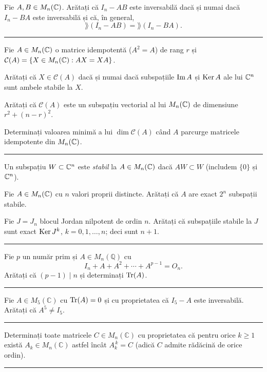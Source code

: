 Fie $A,B \in M_n(\mathbb{C})$. Arătați că $I_n - AB$ este inversabilă dacă și numai dacă $I_n - BA$ este inversabilă și că, în general,
\[
\rang(I_n - AB) = \rang(I_n - BA).
\]
\vspace{1mm}\hrule

Fie $A\in M_n(\mathbb{C})$ o matrice idempotentă ($A^2=A$) de rang $r$ și $\mathcal{C}(A)=\{X\in M_n(\mathbb{C}): AX=XA\}$.
\begin{parti}
  \item Arătați că $X\in\mathcal{C}(A)$ dacă și numai dacă subspațiile $\operatorname{Im} A$ și $\operatorname{Ker} A$ ale lui $\mathbb{C}^n$ sunt ambele stabile la $X$.
  \item Arătați că $\mathcal{C}(A)$ este un subspațiu vectorial al lui $M_n(\mathbb{C})$ de dimensiune $r^2+(n-r)^2$.
  \item Determinați valoarea minimă a lui $\dim\mathcal{C}(A)$ când $A$ parcurge matricele idempotente din $M_n(\mathbb{C})$.
\end{parti}
\vspace{1mm}\hrule

Un subspațiu $W\subset\mathbb{C}^n$ este \emph{stabil} la $A\in M_n(\mathbb{C})$ dacă $AW\subset W$ (includem $\{0\}$ și $\mathbb{C}^n$).
\begin{parti}
  \item Fie $A\in M_n(\mathbb{C})$ cu $n$ valori proprii distincte. Arătați că $A$ are exact $2^n$ subspații stabile.
  \item Fie $J=J_n$ blocul Jordan nilpotent de ordin $n$. Arătați că subspațiile stabile la $J$ sunt exact $\operatorname{Ker} J^k$, $k=0,1,\dots,n$; deci sunt $n+1$.
\end{parti}
\vspace{1mm}\hrule

Fie $p$ un număr prim și $A\in M_n(\mathbb{Q})$ cu
\[ I_n+A+A^2+\cdots+A^{p-1}=O_n. \]
Arătați că $(p-1)\mid n$ și determinați $\operatorname{Tr}(A)$.
\vspace{1mm}\hrule

Fie $A\in M_5(\mathbb{C})$ cu $\operatorname{Tr}(A)=0$ și cu proprietatea că $I_5-A$ este inversabilă. Arătați că $A^5\neq I_5$.
\vspace{1mm}\hrule

Determinați toate matricele $C\in M_n(\mathbb{C})$ cu proprietatea că pentru orice $k\ge1$ există $A_k\in M_n(\mathbb{C})$ astfel încât $A_k^{\,k}=C$ (adică $C$ admite rădăcină de orice ordin).
\vspace{1mm}\hrule

